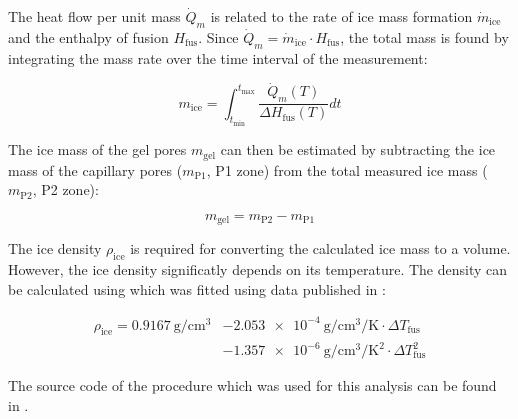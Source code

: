 The heat flow per unit mass $\dot{Q}_{m}$ is related to the rate of ice mass formation $\dot{m}_\text{ice}$ and the enthalpy of fusion $H_\text{fus}$.
Since $\dot{Q}_{m}=\dot{m}_\text{ice}\cdot H_\text{fus}$, the total mass is found by integrating the mass rate over the time interval of the measurement:

\begin{equation}
	m_\text{ice} = \int_{t_{\text{min}}}^{t_{\text{max}}} \frac{\dot{Q}_{m}(T)}{\Delta H_\text{fus}(T)} dt
	\label{eq:ltdsc_ice_integral}
\end{equation}

The ice mass of the gel pores $m_\text{gel}$ can then be estimated by subtracting the ice mass of the capillary pores ($m_\text{P1}$, P1 zone) from the total measured ice mass ($m_\text{P2}$, P2 zone):

\begin{equation}
	m_\text{gel} = m_\text{P2} - m_\text{P1}
	\label{eq:ltdsc_ice2}
\end{equation}


The ice density $\rho_\text{ice}$ is required for converting the calculated ice mass to a volume.
However, the ice density significatly depends on its temperature.
The density can be calculated using  \cite{mueller.2021} which was fitted using data published in \cite{eisenberg.2005}:

\begin{equation}
	\begin{aligned}
		\rho_\text{ice} = \qty{0.9167}{\gram\per\centi\meter\cubed} & - \qty{2.053e-4}{\gram\per\centi\meter\cubed\per\kelvin} \cdot \Delta T_\text{fus}  \\
		& - \qty{1.357e-6}{\gram\per\centi\meter\cubed\per\kelvin\squared} \cdot \Delta T_\text{fus}^2
	\end{aligned}
	\label{eq:ice_density}
\end{equation}

The source code of the procedure which was used for this analysis can be found in \cite{kleiner.2025}. %



